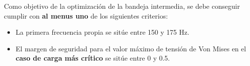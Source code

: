 Como objetivo de la optimización de la bandeja intermedia, se debe conseguir cumplir con \textbf{al menus uno} de los siguientes criterios:

\begin{itemize}
\item La primera frecuencia propia se sitúe entre 150 y 175 Hz.
\item El margen de seguridad para el valor máximo de tensión de Von Mises en el \textbf{caso de carga más crítico} se sitúe entre 0 y 0.5. 
\end{itemize}